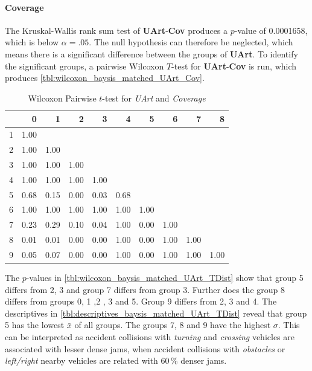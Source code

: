 \paragraph{Coverage}
The Kruskal-Wallis rank sum test of \textbf{UArt}-\textbf{Cov} produces a $p$-value of 0.0001658, which is below $\alpha=.05$. The null hypothesis can therefore be neglected, which means there is a significant difference between the groups of \textbf{UArt}. To identify the significant groups, a pairwise Wilcoxon $T$-test for \textbf{UArt}-\textbf{Cov} is run, which produces \autoref{tbl:wilcoxon_baysis_matched_UArt_Cov}.
\begin{table}[ht]
	\small
	\centering
	\begin{tabular}{rrrrrrrrrr}
		\toprule
		& 0 & 1 & 2 & 3 & 4 & 5 & 6 & 7 & 8 \\ 
		\midrule
		1 & 1.00 &  &  &  &  &  &  &  &  \\ 
		2 & 1.00 & 1.00 &  &  &  &  &  &  &  \\ 
		3 & 1.00 & 1.00 & 1.00 &  &  &  &  &  &  \\ 
		4 & 1.00 & 1.00 & 1.00 & 1.00 &  &  &  &  &  \\ 
		5 & 0.68 & 0.15 & 0.00 & 0.03 & 0.68 &  &  &  &  \\ 
		6 & 1.00 & 1.00 & 1.00 & 1.00 & 1.00 & 1.00 &  &  &  \\ 
		7 & 0.23 & 0.29 & 0.10 & 0.04 & 1.00 & 0.00 & 1.00 &  &  \\ 
		8 & 0.01 & 0.01 & 0.00 & 0.00 & 1.00 & 0.00 & 1.00 & 1.00 &  \\ 
		9 & 0.05 & 0.07 & 0.00 & 0.00 & 1.00 & 0.00 & 1.00 & 1.00 & 1.00 \\ 
		\bottomrule
	\end{tabular}
	\caption{Wilcoxon Pairwise $t$-test for \textit{UArt} and \textit{Coverage}}
	\label{tbl:wilcoxon_baysis_matched_UArt_Cov}
\end{table}
The $p$-values in \autoref{tbl:wilcoxon_baysis_matched_UArt_TDist} show that group 5 differs from 2, 3 and group 7 differs from group 3. Further does the group 8 differs from groups 0, 1 ,2 , 3 and 5. Group 9 differs from 2, 3 and 4. The descriptives in \autoref{tbl:descriptives_baysis_matched_UArt_TDist} reveal that group 5 has the lowest $\bar{x}$ of all groups. The groups 7, 8 and 9 have the highest $\sigma$. This can be interpreted as accident collisions with \textit{turning} and \textit{crossing} vehicles are associated with lesser dense jams, when accident collisions with \textit{obstacles} or \textit{left/right} nearby vehicles are related with 60\,\% denser jams.
